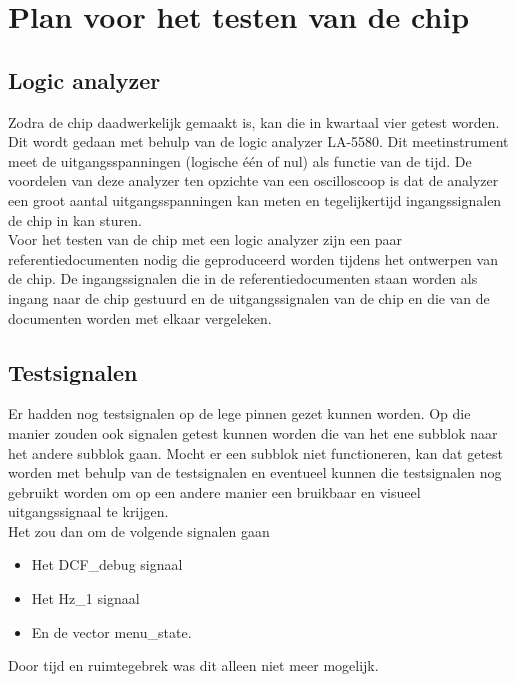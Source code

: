 \chapter{Plan voor het testen van de chip}

\section{Logic analyzer}
Zodra de chip daadwerkelijk gemaakt is, kan die in kwartaal vier getest worden. Dit wordt gedaan met behulp van de logic analyzer LA-5580. Dit meetinstrument meet de uitgangsspanningen (logische \'e\'en of nul) als functie van de tijd. De voordelen van deze analyzer ten opzichte van een oscilloscoop is dat de analyzer een groot aantal uitgangsspanningen kan meten en tegelijkertijd ingangssignalen de chip in kan sturen.\\
Voor het testen van de chip met een logic analyzer zijn een paar referentiedocumenten nodig die geproduceerd worden tijdens het ontwerpen van de chip. De ingangssignalen die in de referentiedocumenten staan worden als ingang naar de chip gestuurd en de uitgangssignalen van de chip en die van de documenten worden met elkaar vergeleken.

\section{Testsignalen}
Er hadden nog testsignalen op de lege pinnen gezet kunnen worden. Op die manier zouden ook signalen getest kunnen worden die van het ene subblok naar het andere subblok gaan. Mocht er een subblok niet functioneren, kan dat getest worden met behulp van de testsignalen en eventueel kunnen die testsignalen nog gebruikt worden om op een andere manier een bruikbaar en visueel uitgangssignaal te krijgen.\\
Het zou dan om de volgende signalen gaan
\begin{itemize}
\item Het DCF\_debug signaal
\item Het Hz\_1 signaal
\item En de vector menu\_state.
\end{itemize}
Door tijd en ruimtegebrek was dit alleen niet meer mogelijk.